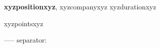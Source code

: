 \textbf{xyzpositionxyz}, xyzcompanyxyz \hfill xyzdurationxyz
\begin{itemize}[leftmargin=1.5em,itemsep=1pt,topsep=2pt]
xyzpointsxyz
\end{itemize}
-----
separator: \vspace{5pt}

